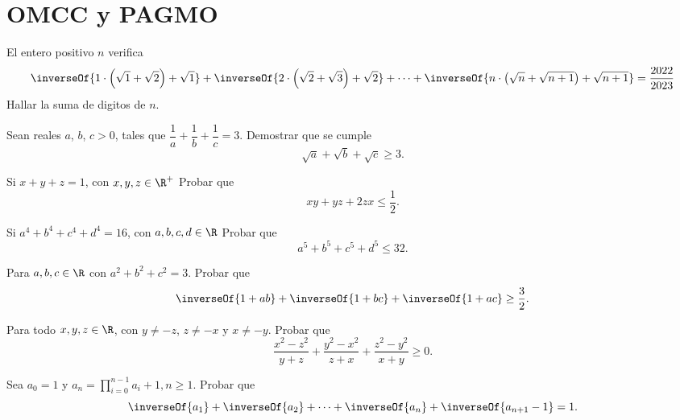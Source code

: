 \section{OMCC y PAGMO}

\begin{section-problem}
    El entero positivo $n$ verifica
    \[\inverseOf{1\cdot\left(\sqrt {1} + \sqrt {2}\right) + \sqrt {1}} + \inverseOf{2\cdot\left(\sqrt {2} + \sqrt {3}\right) + \sqrt {2}} + \cdots + \inverseOf{n\cdot\left(\sqrt {n} + \sqrt {n + 1}\right) + \sqrt {n + 1}} = \frac{2022}{2023}\]
    Hallar la suma de digitos de $n$.
\end{section-problem}

\begin{section-problem}
    Sean reales $a$, $b$, $c > 0$, tales que $\dfrac{1}{a} + \dfrac{1}{b} + \dfrac{1}{c} = 3$.
    Demostrar que se cumple
    \[\sqrt {a} + \sqrt {b} + \sqrt {c} \geq 3.\]
\end{section-problem}

\begin{section-problem}
    Si $x + y + z = 1$, con $x, y, z \in \R^+$
    Probar que
    \[xy + yz + 2zx \leq \frac{1}{2}.\]
\end{section-problem}

\begin{section-problem}
    Si $a^4 + b^4 + c^4 + d^4 = 16$, con $a, b, c, d \in \R$
    Probar que
    \[a^5 + b^5 + c^5 + d^5 \leq 32.\]
\end{section-problem}

\begin{section-problem}
    Para $a, b, c \in \R$ con $a^2 + b^2 + c^2 = 3$.
    Probar que
    \[\inverseOf{1 + ab} + \inverseOf{1 + bc} + \inverseOf{1 + ac} \geq \frac{3}{2}.\]
\end{section-problem}

\begin{section-problem}
    Para todo $x, y, z \in \R$, con $y \neq - z$, $z \neq - x$ y $x \neq - y$.
    Probar que
    \[\frac{x^2 - z^2}{y + z} + \frac{y^2 - x^2}{z + x} + \frac{z^2 - y^2}{x + y} \geq 0.\]
\end{section-problem}

\begin{section-problem}
    Sea $a_0 = 1$ y $a_n = \displaystyle\prod_{i = 0}^{n - 1} a_i + 1, n \geq 1$.
    Probar que
    \[\inverseOf{a_1} + \inverseOf{a_2} + \cdots + \inverseOf{a_n} + \inverseOf{a_{n + 1} - 1} = 1.\]
\end{section-problem}

